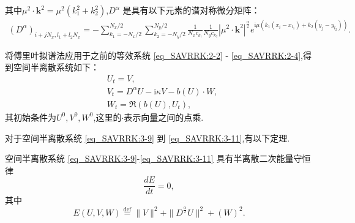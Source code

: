 其中$\mu^{2} \cdot \mathbf{k}^{2}=\mu^{2}\left(k_{1}^{2}+k_{2}^{2}\right)$,$D^{\alpha}$ 是具有以下元素的谱对称微分矩阵：
\begin{align}\label{eq_SAVRRK:54}
\left(D^{\alpha}\right)_{i+j N_{x}, l_{1}+l_{2} N_{x}}=-\sum\limits_{k_{1}=-N_{x} / 2}^{N_{x} / 2} \sum\limits_{k_{2}=-N_{y} / 2}^{N_{y} / 2}\frac{1}{N_{x} c_{k_{1}}} \frac{1}{N_{y} c_{k_{2}}}\left|\mu^{2} \cdot \mathbf{k}^{2}\right|^{\frac{\alpha}{2}} e^{\mathrm{i}\mu\left(k_{1}\left(x_{i}-x_{l_{1}}\right)+k_{2}\left(y_{j}-y_{l_{2}}\right)\right)}.
\end{align}

将傅里叶拟谱法应用于之前的等效系统 \eqref{eq_SAVRRK:2-2} - \eqref{eq_SAVRRK:2-4},得到空间半离散系统如下：
\begin{align}
& U_t=V, \label{eq_SAVRRK:3-9}\\
& V_t=D^{\alpha} U-\mathrm{i}\kappa V- b(U) \cdot W, \label{eq_SAVRRK:3-10}\\
& W_t=\Re\left(b(U), U_t\right),\label{eq_SAVRRK:3-11}
\end{align}
其初始条件为$U^0, V^0, W^0$,这里的$\cdot$表示向量之间的点乘.

对于空间半离散系统 \eqref{eq_SAVRRK:3-9} 到 \eqref{eq_SAVRRK:3-11},有以下定理.

\begin{theorem}	\label{thm3}
空间半离散系统 \eqref{eq_SAVRRK:3-9}-\eqref{eq_SAVRRK:3-11} 具有半离散二次能量守恒律
\begin{equation}
\frac{dE}{dt}=0, \label{eq_SAVRRK:313a}
\end{equation}
其中
\begin{equation}
E(U,V,W)\overset{\text{def}}{=}\|V\|^2 + \|D^\frac{\alpha}{2} U\|^2+\left(W\right)^2.\label{eq_SAVRRK:313}
\end{equation}
\end{theorem}

